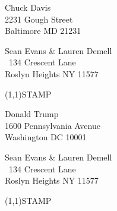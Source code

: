 \documentclass[12pt]{article}
\begin{document}
\begin{center} \begin{Huge} \vspace*{\fill}
Chuck Davis\\
2231 Gough Street\\
Baltimore MD 21231\\
\vspace{\fill} \end{Huge} \end{center}

\clearpage

\begin{minipage}{.5\linewidth} \noindent
Sean Evans \& Lauren Demell\\\ 
134 Crescent Lane\\ 
Roslyn Heights NY 11577
\end{minipage}
\begin{minipage}{.5\linewidth \hspace{-.2in} \vspace{-.3in}}
\begin{flushright}
\framebox(1,1){STAMP}
\end{flushright}
\end{minipage}

\begin{center} \begin{Huge} \vspace*{\fill}
Donald Trump\\
1600 Pennsylvania Avenue\\
Washington DC 10001\\
\vspace{\fill} \end{Huge} \end{center}

\clearpage

\begin{minipage}{.5\linewidth} \noindent
Sean Evans \& Lauren Demell\\\ 
134 Crescent Lane\\ 
Roslyn Heights NY 11577
\end{minipage}
\begin{minipage}{.5\linewidth \hspace{-.2in} \vspace{-.3in}}
\begin{flushright}
\framebox(1,1){STAMP}
\end{flushright}
\end{minipage}
\end{document}
